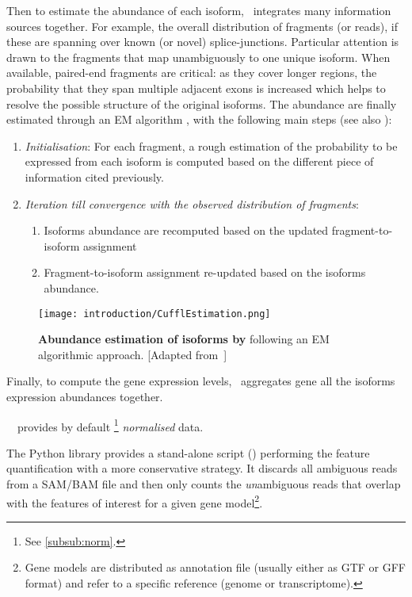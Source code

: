 Then to estimate the abundance of each isoform, \cuffl\ integrates many
information sources together. For example, the overall distribution of fragments
(or reads), if these are spanning over known (or novel) splice-junctions.
Particular attention is drawn to the fragments that map unambiguously to one
unique isoform. When available, paired-end fragments are critical:
as they cover longer regions, the probability
that they span multiple adjacent exons is increased which helps to resolve
the possible structure of the original isoforms.  The
abundance are finally estimated through an \gls{EM} algorithm
\citep{EM-what,EM-algo-latest},
with the following main steps (see also ):
\begin{enumerate}
    \item \emph{Initialisation}: For each fragment, a rough estimation of the
        probability to be expressed from each isoform is computed based on the
        different piece of information cited previously.
\item \emph{Iteration till convergence with the observed distribution of fragments}:
    \begin{enumerate}
        \item Isoforms abundance are recomputed based on the updated
            fragment-to-isoform assignment
        \item Fragment-to-isoform assignment re-updated based on the isoforms
            abundance.
    \end{enumerate}
\end{enumerate}


\begin{figure}
    \texttt{[image: introduction/CufflEstimation.png]}\centering
    \caption[Abundance estimation of isoforms by
    Cufflinks]{\label{fig:cuffEstimation}\textbf{Abundance estimation of isoforms
    by \cuffl} following an \gls{EM} algorithmic approach. [Adapted
    from~\cite{Turner2015}]}
\end{figure}

Finally, to compute the gene expression levels, \cuffl\ aggregates 
gene all the isoforms expression abundances together.

\NB\ \cuffl\ provides by default \FPKM\footnote{See \cref{subsub:norm}.}
\emph{normalised} data.

The \gls{Python} library  provides a stand-alone script
(\htseq) performing the feature quantification with a more conservative strategy.
It discards all ambiguous reads from a \gls{SAM}/\gls{BAM} file and then
only counts the \emph{un}ambiguous reads that overlap with the features of
interest for a given gene model\footnote{Gene models are distributed as
annotation file (usually either as \gls{GTF} or \gls{GFF} format) and refer
to a specific reference (genome or transcriptome).}.

